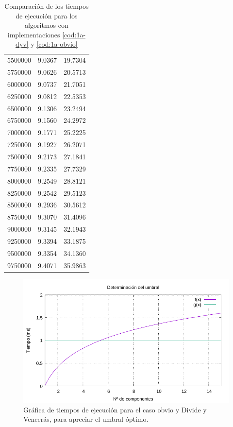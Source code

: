 \begin{table}
\begin{tabular}{|r|r|r|}
		5500000 & 9.0367 & 19.7304 \\ 
		5750000 & 9.0626 & 20.5713 \\ 
		6000000 & 9.0737 & 21.7051 \\ 
		6250000 & 9.0812 & 22.5353 \\ 
		6500000 & 9.1306 & 23.2494 \\ 
		6750000 & 9.1560 & 24.2972 \\ 
		7000000 & 9.1771 & 25.2225 \\ 
		7250000 & 9.1927 & 26.2071 \\ 
		7500000 & 9.2173 & 27.1841 \\ 
		7750000 & 9.2335 & 27.7329 \\ 
		8000000 & 9.2549 & 28.8121 \\ 
		8250000 & 9.2542 & 29.5123 \\ 
		8500000 & 9.2936 & 30.5612 \\ 
		8750000 & 9.3070 & 31.4096 \\ 
		9000000 & 9.3145 & 32.1943 \\ 
		9250000 & 9.3394 & 33.1875 \\ 
		9500000 & 9.3354 & 34.1360 \\ 
		9750000 & 9.4071 & 35.9863 \\ 
		\hline
	\end{tabular}

	\caption{Comparación de los tiempos de ejecución para los algoritmos con implementaciones \ref{cod:1a-dyv} y \ref{cod:1a-obvio}}
	\label{tab:1a-com}
\end{table}

\begin{figure}
	\centering
	\includegraphics[scale=0.76]{img/e1a-umbral.pdf}
	\caption{Gráfica de tiempos de ejecución para el caso obvio y Divide y Vencerás, para apreciar el umbral
	óptimo.}
	\label{fig:1a-com-graph}
\end{figure}


